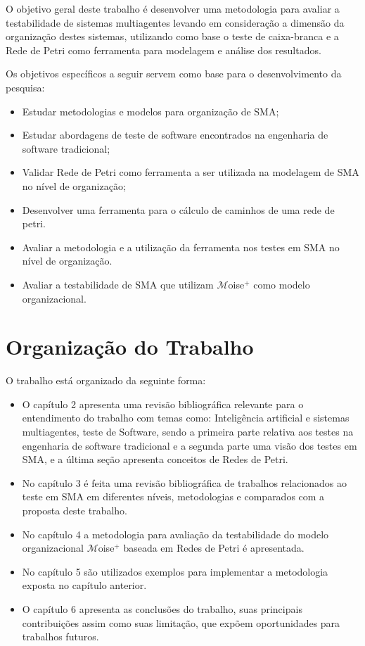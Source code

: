 O objetivo geral deste trabalho é desenvolver uma metodologia para avaliar a testabilidade de sistemas multiagentes levando em consideração a dimensão da organização destes sistemas, utilizando como base o teste de caixa-branca e a Rede de Petri como ferramenta para modelagem e análise dos resultados.

Os objetivos específicos a seguir servem como base para o desenvolvimento da pesquisa:

\begin{itemize}

\item Estudar metodologias e modelos para organização de SMA;
\item Estudar abordagens de teste de software encontrados na engenharia de software tradicional;
\item Validar Rede de Petri como ferramenta a ser utilizada na modelagem de SMA no nível de organização;
\item Desenvolver uma ferramenta para o cálculo de caminhos de uma rede de petri.
\item Avaliar a metodologia e a utilização da ferramenta nos testes em SMA no nível de organização.
\item Avaliar a testabilidade de SMA que utilizam $\mathcal{M}$oise$^{+}$ como modelo organizacional.
\end{itemize}


\section{Organização do Trabalho}

O trabalho está organizado da seguinte forma:

\begin{itemize}
\item O capítulo 2 apresenta uma revisão bibliográfica relevante para o entendimento do trabalho com temas como: Inteligência artificial e sistemas multiagentes, teste de Software, sendo a primeira parte relativa aos testes na engenharia de software tradicional e a segunda parte uma visão dos testes em SMA, e a última seção apresenta conceitos de Redes de Petri.

\item No capítulo 3 é feita uma revisão bibliográfica de trabalhos relacionados ao teste em SMA em diferentes níveis, metodologias e comparados com a proposta deste trabalho.

\item No capítulo 4 a metodologia para avaliação da testabilidade do modelo organizacional $\mathcal{M}$oise$^{+}$ baseada em Redes de Petri é apresentada.

\item No capítulo 5 são utilizados exemplos para implementar a metodologia exposta no capítulo anterior.

\item O capítulo 6 apresenta as conclusões do trabalho, suas principais contribuições assim como suas limitação, que expõem oportunidades para trabalhos futuros.
\end{itemize}

